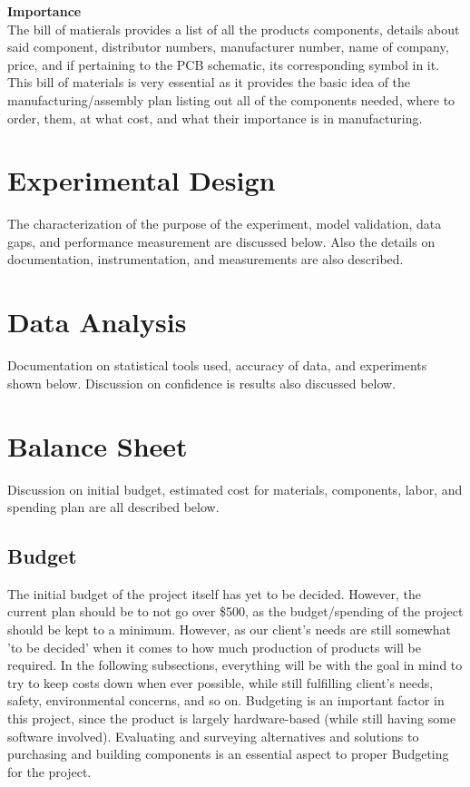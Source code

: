\documentclass[12pt]{article}
\begin{document}
{{{{{{{	 \noindent \textbf{Importance}\\
	 \indent The bill of matierals provides a list of all the products components, details about said component, distributor numbers, manufacturer number, name of company, price, and if pertaining to the PCB schematic, its corresponding symbol in it. This bill of materials is very essential as it provides the basic idea of the manufacturing/assembly plan listing out all of the components needed, where to order, them, at what cost, and what their importance is in manufacturing. 
	
	\newpage

\section{Experimental Design}
	The characterization of the purpose of the experiment, model validation, data gaps, and performance measurement are discussed below. Also the details on documentation, instrumentation, and measurements are also described.
  	
	\newpage	
  	
\section{Data Analysis}
	Documentation on statistical tools used, accuracy of data, and experiments shown below. Discussion on confidence is results also discussed below.

	\newpage

\section{Balance Sheet}
Discussion on initial budget, estimated cost for materials, components, labor, and spending plan are all described below.

		\subsection{Budget}
		The initial budget of the project itself has yet to be decided. However, the current plan should be to not go over \$500, as the budget/spending of the project should be kept to a minimum. However, as our client's needs are still somewhat 'to be decided' when it comes to how much production of products will be required. In the following subsections, everything will be with the goal in mind to try to keep costs down when ever possible, while still fulfilling client's needs, safety, environmental concerns, and so on. Budgeting is an important factor in this project, since the product is largely hardware-based (while still having some software involved). Evaluating and surveying alternatives and solutions to purchasing and building components is an essential aspect to proper Budgeting for the project.
		
}}}}}}}
\end{document}
